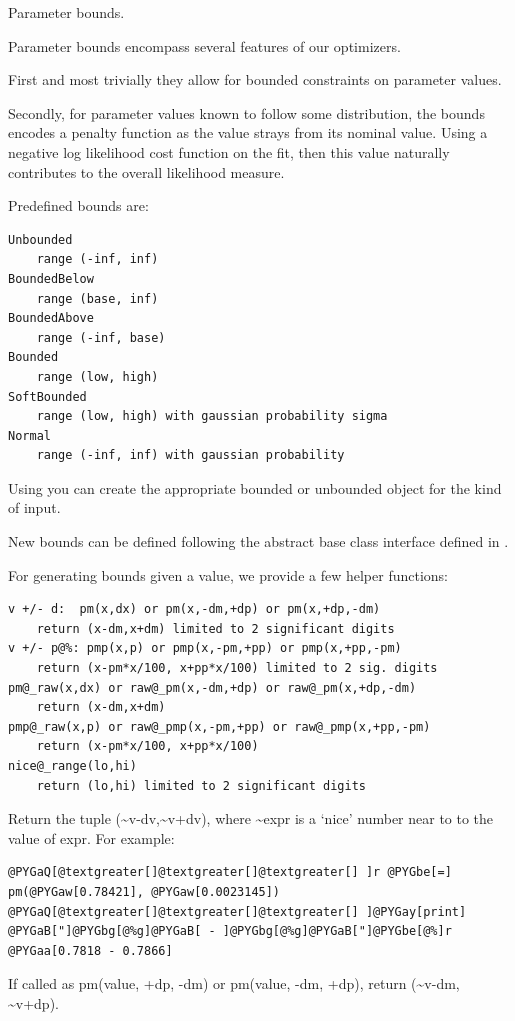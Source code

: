 \documentclass[letterpaper,10pt,english]{sphinxmanual}
\begin{document}
\label{api/mystic.bounds:module-refl1d.mystic.bounds}
Parameter bounds.

Parameter bounds encompass several features of our optimizers.

First and most trivially they allow for bounded constraints on
parameter values.

Secondly, for parameter values known to follow some distribution,
the bounds encodes a penalty function as the value strays from
its nominal value.  Using a negative log likelihood cost function
on the fit, then this value naturally contributes to the overall
likelihood measure.

Predefined bounds are:

\begin{Verbatim}[commandchars=@\[\]]
Unbounded
    range (-inf, inf)
BoundedBelow
    range (base, inf)
BoundedAbove
    range (-inf, base)
Bounded
    range (low, high)
SoftBounded
    range (low, high) with gaussian probability sigma
Normal
    range (-inf, inf) with gaussian probability
\end{Verbatim}

Using  you can create the appropriate bounded
or unbounded object for the kind of input.

New bounds can be defined following the abstract base class
interface defined in .

For generating bounds given a value, we provide a few helper
functions:

\begin{Verbatim}[commandchars=@\[\]]
v +/- d:  pm(x,dx) or pm(x,-dm,+dp) or pm(x,+dp,-dm)
    return (x-dm,x+dm) limited to 2 significant digits
v +/- p@%: pmp(x,p) or pmp(x,-pm,+pp) or pmp(x,+pp,-pm)
    return (x-pm*x/100, x+pp*x/100) limited to 2 sig. digits
pm@_raw(x,dx) or raw@_pm(x,-dm,+dp) or raw@_pm(x,+dp,-dm)
    return (x-dm,x+dm)
pmp@_raw(x,p) or raw@_pmp(x,-pm,+pp) or raw@_pmp(x,+pp,-pm)
    return (x-pm*x/100, x+pp*x/100)
nice@_range(lo,hi)
    return (lo,hi) limited to 2 significant digits
\end{Verbatim}

\begin{fulllineitems}
\label{api/mystic.bounds:refl1d.mystic.bounds.pm}
Return the tuple (\textasciitilde{}v-dv,\textasciitilde{}v+dv), where \textasciitilde{}expr is a `nice' number near to
to the value of expr.  For example:

\begin{Verbatim}[commandchars=@\[\]]
@PYGaQ[@textgreater[]@textgreater[]@textgreater[] ]r @PYGbe[=] pm(@PYGaw[0.78421], @PYGaw[0.0023145])
@PYGaQ[@textgreater[]@textgreater[]@textgreater[] ]@PYGay[print] @PYGaB["]@PYGbg[@%g]@PYGaB[ - ]@PYGbg[@%g]@PYGaB["]@PYGbe[@%]r
@PYGaa[0.7818 - 0.7866]
\end{Verbatim}

If called as pm(value, +dp, -dm) or pm(value, -dm, +dp),
return (\textasciitilde{}v-dm, \textasciitilde{}v+dp).

\end{fulllineitems}
\end{document}
